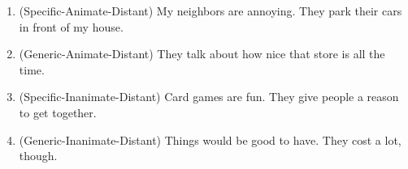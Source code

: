 \documentclass{article}
\begin{document}
\begin{enumerate}
            \item (Specific-Animate-Distant) My neighbors are annoying. They park their cars in front of my house.
            \item (Generic-Animate-Distant) They talk about how nice that store is all the time.

            \item (Specific-Inanimate-Distant) Card games are fun. They give people a reason to get together.
            \item (Generic-Inanimate-Distant) Things would be good to have. They cost a lot, though.
    \end{enumerate}
\end{document}
